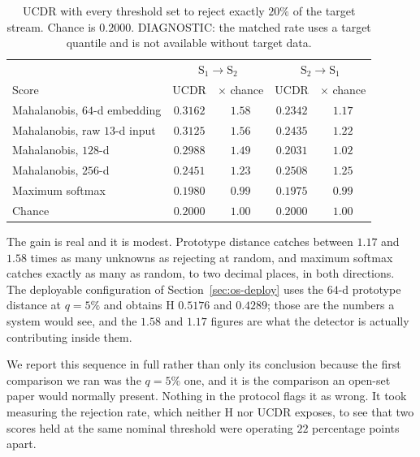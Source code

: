 \begin{table}[t]
\centering
\caption{UCDR with every threshold set to reject exactly $20\%$ of the target stream.
Chance is $0.2000$. DIAGNOSTIC: the matched rate uses a target quantile and is not
available without target data.}
\label{tab:osmatched}
\small
\begin{tabular}{@{}lcccc@{}}
\toprule
 & \multicolumn{2}{c}{$\text{S}_1\!\to\!\text{S}_2$} & \multicolumn{2}{c}{$\text{S}_2\!\to\!\text{S}_1$} \\
Score & UCDR & $\times$ chance & UCDR & $\times$ chance \\
\midrule
Mahalanobis, $64$-d embedding & $\mathbf{0.3162}$ & $1.58$ & $0.2342$ & $1.17$ \\
Mahalanobis, raw $13$-d input & $0.3125$ & $1.56$ & $0.2435$ & $1.22$ \\
Mahalanobis, $128$-d          & $0.2988$ & $1.49$ & $0.2031$ & $1.02$ \\
Mahalanobis, $256$-d          & $0.2451$ & $1.23$ & $\mathbf{0.2508}$ & $1.25$ \\
Maximum softmax               & $0.1980$ & $0.99$ & $0.1975$ & $0.99$ \\
\midrule
Chance                        & $0.2000$ & $1.00$ & $0.2000$ & $1.00$ \\
\bottomrule
\end{tabular}
\end{table}

The gain is real and it is modest. Prototype distance catches between $1.17$ and $1.58$
times as many unknowns as rejecting at random, and maximum softmax catches exactly as many
as random, to two decimal places, in both directions. The deployable configuration of
Section~\ref{sec:os-deploy} uses the $64$-d prototype distance at $q=5\%$ and obtains H
$0.5176$ and $0.4289$; those are the numbers a system would see, and the $1.58$ and $1.17$
figures are what the detector is actually contributing inside them.

We report this sequence in full rather than only its conclusion because the first
comparison we ran was the $q=5\%$ one, and it is the comparison an open-set paper would
normally present. Nothing in the protocol flags it as wrong. It took measuring the
rejection rate, which neither H nor UCDR exposes, to see that two scores held at the same
nominal threshold were operating $22$ percentage points apart.
